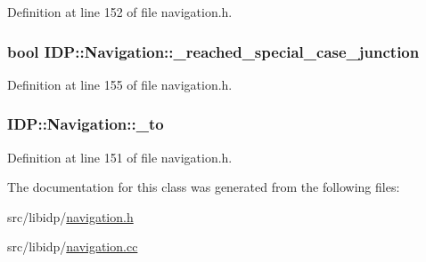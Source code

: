 Definition at line 152 of file navigation.h.

\hypertarget{classIDP_1_1Navigation_afedddd1408af4893658b8f49d4200af8}{
\subsubsection[{\_\-reached\_\-special\_\-case\_\-junction}]{\setlength{\rightskip}{0pt plus 5cm}bool {\bf IDP::Navigation::\_\-reached\_\-special\_\-case\_\-junction}}}
\label{classIDP_1_1Navigation_afedddd1408af4893658b8f49d4200af8}


Definition at line 155 of file navigation.h.

\hypertarget{classIDP_1_1Navigation_a76df45b8316e55560e1adc9165700d0f}{
\subsubsection[{\_\-to}]{ {\bf IDP::Navigation::\_\-to}}}
\label{classIDP_1_1Navigation_a76df45b8316e55560e1adc9165700d0f}


Definition at line 151 of file navigation.h.



The documentation for this class was generated from the following files:\begin{DoxyCompactItemize}
\item 
src/libidp/\hyperlink{navigation_8h}{navigation.h}\item 
src/libidp/\hyperlink{navigation_8cc}{navigation.cc}\end{DoxyCompactItemize}
